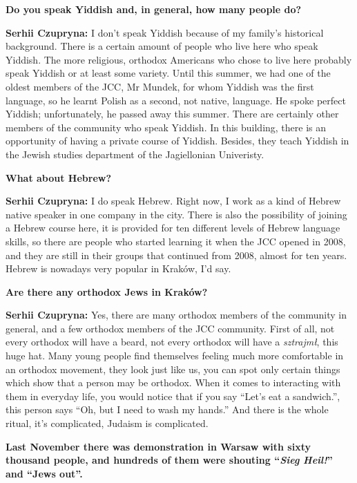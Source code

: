 \textbf{Do you speak Yiddish and, in general, how many people do?} \par
\textbf{Serhii Czupryna:} I don’t speak Yiddish because of my family’s historical background. There is a certain amount of people who live here who speak Yiddish. The more religious, orthodox Americans who chose to live here probably speak Yiddish or at least some variety. Until this summer, we had one of the oldest members of the JCC, Mr Mundek, for whom Yiddish was the first language, so he learnt Polish as a second, not native, language. He spoke perfect Yiddish; unfortunately, he passed away this summer. There are certainly other members of the community who speak Yiddish. In this building, there is an opportunity of having a private course of Yiddish. Besides, they teach Yiddish in the Jewish studies department of the Jagiellonian Univeristy.\par
\textbf{What about Hebrew?} \par
\textbf{Serhii Czupryna:} I do speak Hebrew. Right now, I work as a kind of Hebrew native speaker in one company in the city. There is also the possibility of joining a Hebrew course here, it is provided for ten different levels of Hebrew language skills, so there are people who started learning it when the JCC opened in 2008, and they are still in their groups that continued from 2008, almost for ten years. Hebrew is nowadays very popular in Kraków, I’d say.  \par 
\textbf{Are there any orthodox Jews in Kraków?} \par 
\textbf{Serhii Czupryna:} Yes, there are many orthodox members of the community in general, and a few orthodox members of the JCC community. First of all, not every orthodox will have a beard, not every orthodox will have a \textit{sztrajmł}, this huge hat. Many young people find themselves feeling much more comfortable in an orthodox movement, they look just like us, you can spot only certain things which show that a person may be orthodox. When it comes to interacting with them in everyday life, you would notice that if you say ``Let’s eat a sandwich.'', this person says ``Oh, but I need to wash my hands.'' And there is the whole ritual, it’s complicated, Judaism is complicated. \par
\textbf{Last November there was demonstration in Warsaw with sixty thousand people, and hundreds of them were shouting ``\textit{Sieg Heil!}'' and ``Jews out''.}\par 
